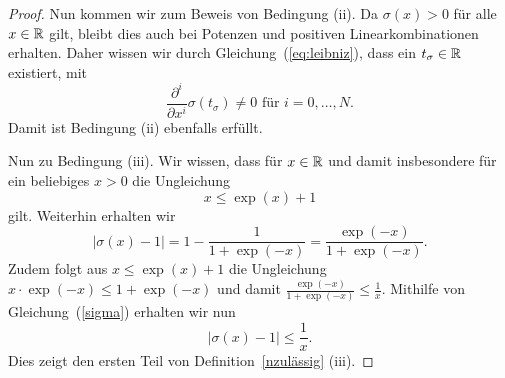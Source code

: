 \begin{proof}
Nun kommen wir zum Beweis von Bedingung (ii). 
Da $\sigma(x) > 0$ für alle $x \in \mathbb{R}$ gilt, bleibt dies auch bei Potenzen und positiven Linearkombinationen erhalten. Daher wissen wir durch Gleichung~(\ref{eq:leibniz}), dass ein $t_{\sigma} \in \mathbb{R}$ existiert, mit $$\frac{\partial^i}{\partial x^i}\sigma(t_{\sigma}) \neq 0 \text{ für } i = 0,\dots,N.$$
Damit ist Bedingung (ii) ebenfalls erfüllt.

Nun zu Bedingung (iii). Wir wissen, dass für $x \in \mathbb{R}$ und damit insbesondere für ein beliebiges $x > 0$ die Ungleichung $$ x \leq \exp(x) + 1$$ gilt. Weiterhin erhalten wir 
\begin{equation}
\label{sigma}
|\sigma(x) - 1| = 1 - \frac{1}{1 + \exp(-x)} = \frac{\exp(-x)}{1 + \exp(-x)}.
\end{equation}
Zudem folgt aus $x \leq \exp(x) + 1$ die Ungleichung $x \cdot \exp(-x) \leq 1 + \exp(-x)$ und damit $\frac{\exp(-x)}{1 + \exp(-x)} \leq \frac{1}{x}$. Mithilfe von Gleichung~(\ref{sigma}) erhalten wir nun 
$$
|\sigma(x) - 1| \leq \frac{1}{x}.
$$
Dies zeigt den ersten Teil von Definition~\ref{nzulässig} (iii).


\end{proof}
